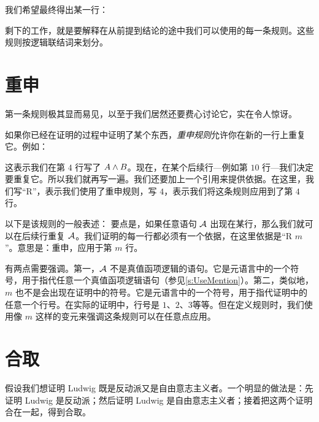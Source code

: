 \begin{fitchproof}
	\PR
	\PR
	\PR
\end{fitchproof}


我们希望最终得出某一行：


\begin{fitchproof}
\end{fitchproof}


剩下的工作，就是要解释在从前提到结论的途中我们可以使用的每一条规则。这些规则按逻辑联结词来划分。

\section{重申}
第一条规则极其显而易见，以至于我们居然还要费心讨论它，实在令人惊讶。

如果你已经在证明的过程中证明了某个东西，\emph{重申规则}允许你在新的一行上重复它。例如：


\begin{fitchproof}
	\ellipsesline
	 
\end{fitchproof}


这表示我们在第 $4$ 行写了 $A \wedge B$。现在，在某个后续行---例如第 $10$ 行---我们决定要重复它。所以我们就再写一遍。我们还要加上一个引用来提供依据。在这里，我们写“R”，表示我们使用了重申规则，写 $4$，表示我们将这条规则应用到了第 $4$ 行。

以下是该规则的一般表述：
要点是，如果任意语句 $\mathcal{A}$ 出现在某行，那么我们就可以在后续行重复 $\mathcal{A}$。我们证明的每一行都必须有一个依据，在这里依据是“R $m$”。意思是：重申，应用于第 $m$ 行。

有两点需要强调。第一，$\mathcal{A}$ 不是真值函项逻辑的语句。它是元语言中的一个符号，用于指代任意一个真值函项逻辑语句（参见\cref{s:UseMention}）。第二，类似地，$m$ 也不是会出现在证明中的符号。它是元语言中的一个符号，用于指代证明中的任意一个行号。在实际的证明中，行号是 $1$、$2$、$3$等等。但在定义规则时，我们使用像 $m$ 这样的变元来强调这条规则可以在任意点应用。

\section{合取}
假设我们想证明 Ludwig 既是反动派又是自由意志主义者。一个明显的做法是：先证明 Ludwig 是反动派；然后证明 Ludwig 是自由意志主义者；接着把这两个证明合在一起，得到合取。

